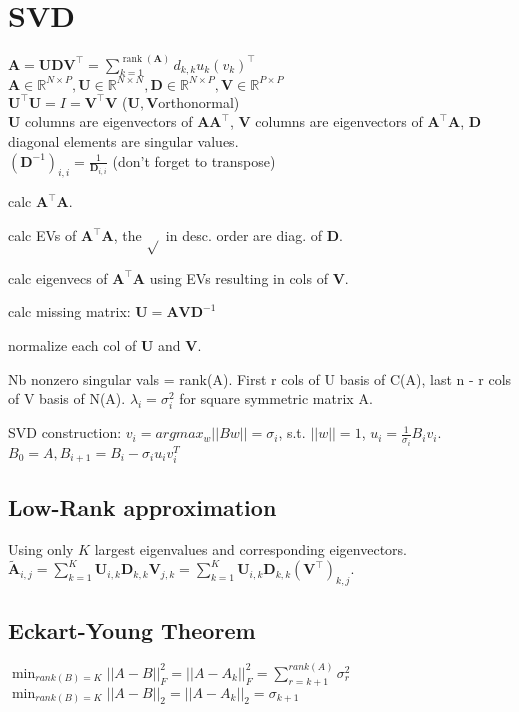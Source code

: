 \section{SVD}
$\mathbf{A} = \mathbf{U} \mathbf{D} \mathbf{V}^\top = \sum_{k=1}^{\operatorname{rank}(\mathbf{A})} d_{k,k} u_k (v_k)^\top$\\
$\mathbf{A} \in \mathbb{R}^{N \times P}, \mathbf{U} \in \mathbb{R}^{N \times N}, \mathbf{D} \in \mathbb{R}^{N \times P}, \mathbf{V} \in \mathbb{R}^{P \times P}$\\
$\mathbf{U}^\top \mathbf{U} = I = \mathbf{V}^\top \mathbf{V}$ ($\mathbf{U}, \mathbf{V}$orthonormal)\\
$\mathbf{U}$ columns are eigenvectors of $\mathbf{A} \mathbf{A}^\top$, $\mathbf{V}$ columns are eigenvectors of $\mathbf{A}^\top \mathbf{A}$, $\mathbf{D}$ diagonal elements are singular values.\\
$(\mathbf{D}^{-1})_{i,i} = \frac{1}{\mathbf{D}_{i, i}}$ (don't forget to transpose)

\begin{inparaenum}
	\item calc $\mathbf{A}^\top \mathbf{A}$.
	\item calc EVs of $\mathbf{A}^\top \mathbf{A}$, the $\sqrt{}$ in desc. order are diag. of $\mathbf{D}$.
	\item calc eigenvecs of $\mathbf{A}^\top \mathbf{A}$ using EVs resulting in cols of $\mathbf{V}$.
    \item calc missing matrix: $\mathbf{U} = \mathbf{A} \mathbf{V} \mathbf{D}^{-1}$
	\item normalize each col of $\mathbf{U}$ and $\mathbf{V}$.
\end{inparaenum}

Nb nonzero singular vals = rank(A). First r cols of U basis of C(A), last n - r cols of V basis of N(A). 
$\lambda_i = \sigma_i^2$ for square symmetric matrix A.

SVD construction: $v_i = arg max_w ||Bw|| = \sigma_i $, s.t. $||w|| = 1$, $u_i = \frac{1}{\sigma_i} B_i v_i$. $B_0 = A, B_{i+1} = B_i - \sigma_i u_i v_i^T$


\subsection*{Low-Rank approximation}
Using only $K$ largest eigenvalues and corresponding eigenvectors. $\tilde{\mathbf{A}}_{i, j} = \sum_{k=1}^K \mathbf{U}_{i, k} \mathbf{D}_{k,k} \mathbf{V}_{j, k} = \sum_{k=1}^K \mathbf{U}_{i, k} \mathbf{D}_{k,k} (\mathbf{V}^\top)_{k, j}$.

\subsection*{Eckart-Young Theorem}
$\min_{rank(B)=K} ||A-B||_F^2 = ||A-A_k||_F^2 = \sum_{r=k+1}^{rank(A)} \sigma_r^2$
$\min_{rank(B)=K} ||A-B||_2 = ||A-A_k||_2 = \sigma_{k+1}$

